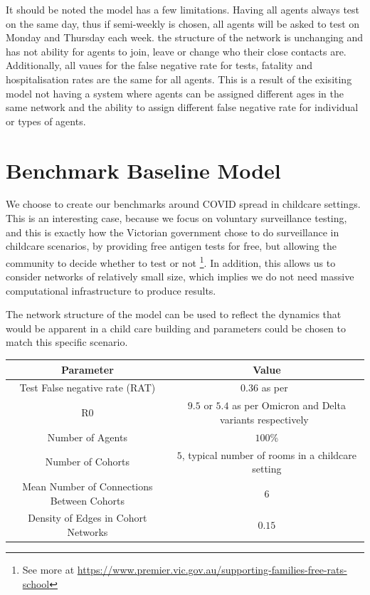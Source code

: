 \documentclass{article}
\begin{document}
It should be noted the model has a few limitations. Having all agents always test on the same day, thus if semi-weekly is chosen, all agents will be asked to test on Monday and Thursday each week. the structure of the network is unchanging and has not ability for agents to join, leave or change who their close contacts are. Additionally, all vaues for the false negative rate for tests, fatality and hospitalisation rates are the same for all agents. This is a result of the exisiting model not having a system where agents can be assigned different ages in the same network and the ability to assign different false negative rate for individual or types of agents.




\newpage
\section{Benchmark Baseline Model}

We choose to create our benchmarks around COVID spread in childcare settings. 
This is an interesting case, because we focus on voluntary surveillance testing, and this is exactly how the Victorian government chose to do surveillance in childcare scenarios, by providing free antigen tests for free, but allowing the community to decide whether to test or not \footnote{See more at \url{https://www.premier.vic.gov.au/supporting-families-free-rats-school}}.  
In addition, this allows us to consider networks of relatively small size, which implies we do not need massive computational infrastructure to produce results. 


The network structure of the model can be used to reflect the dynamics that would be apparent in a child care building and parameters could be chosen to match this specific scenario.\newline

\begin{tabular}{|c|c|}
\hline
\textbf{Parameter} & \textbf{Value} \\ \hline
Test False negative rate (RAT) & $0.36$ as per~\cite{van_de_mortel_2022} \\ \hline
R0 &  $9.5$ or $5.4$ as per Omicron and Delta variants respectively~\cite{liu_rocklov_2022} \\ \hline
Number of Agents & $100$\% \\ \hline
Number of Cohorts & $5$, typical number of rooms in a childcare setting \\ \hline
Mean Number of Connections Between Cohorts  & $6$ \\ \hline
Density of Edges in Cohort Networks  & $0.15$ \\ \hline
\end{tabular}
\end{document}
